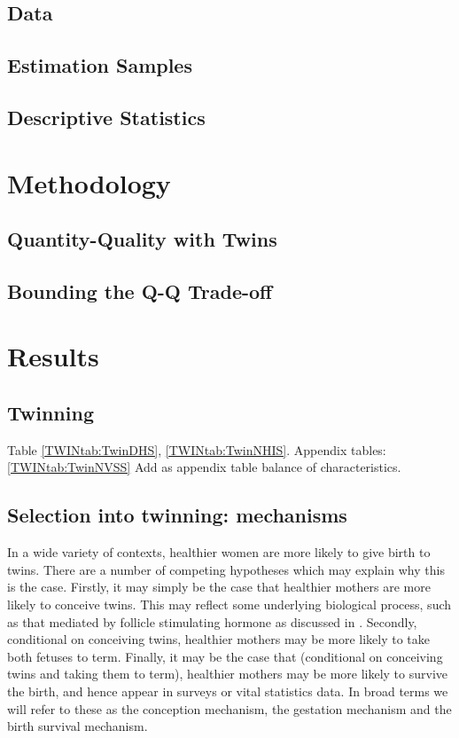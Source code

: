 \documentclass[subeqn]{article}
\begin{document}
\begin{spacing}{1.4}
\subsection{Data}                                  \label{TWINsscn:data}
\subsection{Estimation Samples}                    \label{TWINsscn:samples}
\subsection{Descriptive Statistics}                \label{TWINsscn:descriptives}
\section{Methodology}                              \label{TWINscn:method}
\subsection{Quantity-Quality with Twins}           \label{TWINsscn:methodQQ}
\subsection{Bounding the Q-Q Trade-off}            \label{TWINsscn:methodBounds}
\section{Results}                                  \label{TWINscn:results}
\subsection{Twinning}                              \label{TWINsscn:twinning}
Table \ref{TWINtab:TwinDHS}, \ref{TWINtab:TwinNHIS}.
Appendix tables: \ref{TWINtab:TwinNVSS}
Add as appendix table balance of characteristics.

\subsection{Selection into twinning: mechanisms}   \label{TWINsscn:selection}
In a wide variety of contexts, healthier women are more likely to give birth to
twins.  There are a number of competing hypotheses which may explain why this is
the case.  Firstly, it may simply be the case that healthier mothers are more 
likely to conceive twins.  This may reflect some underlying biological process, 
such as that mediated by follicle stimulating hormone as discussed in 
\citet{Hall2003}.  Secondly, conditional on conceiving twins, healthier mothers 
may be more likely to take both fetuses to term.  Finally, it may be the case 
that (conditional on conceiving twins and taking them to term), healthier mothers 
may be more likely to survive the birth, and hence appear in surveys or vital 
statistics data.  In broad terms we will refer to these as the conception 
mechanism, the gestation mechanism and the birth survival mechanism.


\end{spacing}
\end{document}
